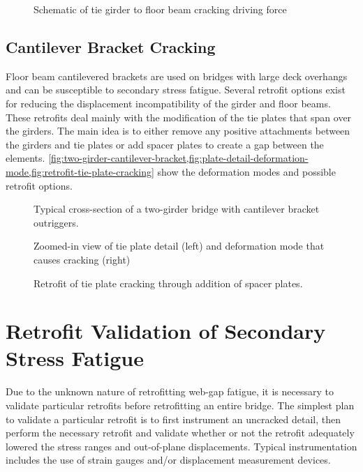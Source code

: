 \begin{figure}
  \caption{Schematic of tie girder to floor beam cracking driving force}
  \label{fig:girder-floor-beam-cracking}
\end{figure}

\subsection{Cantilever Bracket Cracking}
Floor beam cantilevered brackets are used on bridges with large deck overhangs and can be susceptible to
secondary stress fatigue. Several retrofit options exist for reducing the displacement incompatibility of the girder and
floor beams. These retrofits deal mainly with the modification of the tie plates that span over the girders. The main
idea is to either remove any positive attachments between the girders and tie plates or add spacer plates to create a
gap between the elements. \cref{fig:two-girder-cantilever-bracket,fig:plate-detail-deformation-mode,fig:retrofit-tie-plate-cracking} show the deformation modes and possible retrofit options.

\begin{figure}
  \caption{Typical cross-section of a two-girder bridge with cantilever bracket outriggers.}
  \label{fig:two-girder-cantilever-bracket}
\end{figure}

\begin{figure}
  \caption{Zoomed-in view of tie plate detail (left) and deformation mode that causes cracking (right)}
  \label{fig:plate-detail-deformation-mode}
\end{figure}

\begin{figure}
  \caption{Retrofit of tie plate cracking through addition of spacer plates.}
  \label{fig:retrofit-tie-plate-cracking}
\end{figure}


\section{Retrofit Validation of Secondary Stress Fatigue}
Due to the unknown nature of retrofitting web-gap fatigue, it is necessary to validate particular retrofits before
retrofitting an entire bridge. The simplest plan to validate a particular retrofit is to first instrument an uncracked
detail, then perform the necessary retrofit and validate whether or not the retrofit adequately lowered the stress ranges
and out-of-plane displacements. Typical instrumentation includes the use of strain gauges and/or displacement
measurement devices.

